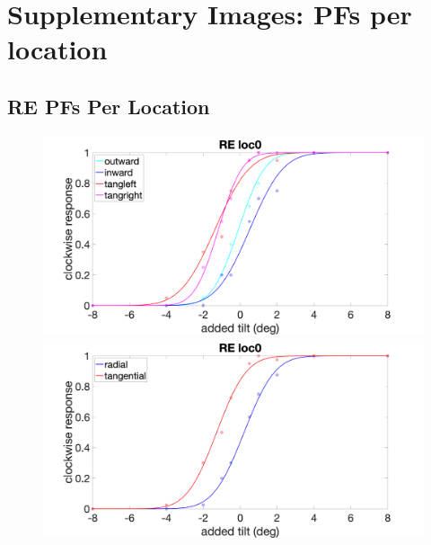 \documentclass[11pt]{article} %
\begin{document}
\newpage
\section{Supplementary Images: PFs per location}
\subsection{RE PFs Per Location}
\begin{figure}[H]
\centering %
\includegraphics[scale=.15]{Images/RE_PF_loc0_4conds.png}
\includegraphics[scale=.15]{Images/RE_PF_loc0_2conds.png}
\end{figure}
\end{document}
